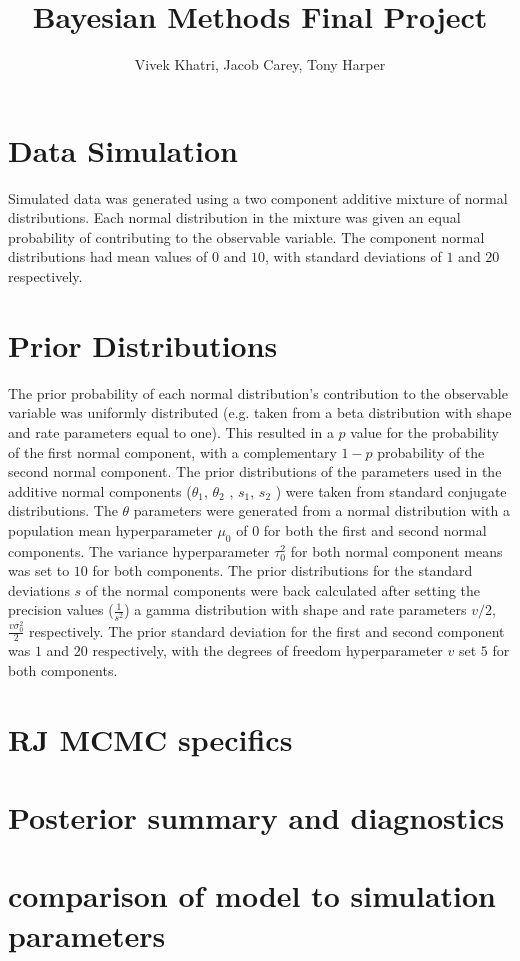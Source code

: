 \documentclass[12pt]{article}
\title{Bayesian Methods Final Project}
\author{Vivek Khatri, Jacob Carey, Tony Harper}
\date{}
\begin{document}
\section*{Data Simulation}
Simulated data was generated using a two component additive mixture of normal distributions.  Each normal distribution in the mixture was given an equal probability of contributing to the observable variable. The component normal distributions had mean values of $0$ and $10$, with standard deviations of $1$ and $20$ respectively.

\section*{Prior Distributions}
The prior probability of each normal distribution’s contribution to the observable variable was uniformly distributed (e.g. taken from a beta distribution with shape and rate parameters equal to one). This resulted in a $p$ value for the probability of the first normal component, with a complementary $1-p$ probability of the second normal component.
The prior distributions of the parameters used in the additive normal components ($\theta_1$, $\theta_2$ , $s_1$, $s_2$ ) were taken from standard conjugate distributions. The $\theta$ parameters were generated from a normal distribution with a population mean hyperparameter $\mu_0$ of $0$ for both the first and second normal components. The variance hyperparameter $\tau_0^2$ for both normal component means was set to $10$ for both components.
	The prior distributions for the standard deviations $s$ of the normal components were back calculated after setting the precision values ($\frac{1}{s^2}$)  a gamma distribution with shape and rate parameters $v/2$, $\frac{v\sigma_0^2}{2}$ respectively. The prior standard deviation for the first and second component  was $1$ and $20$ respectively, with the degrees of freedom hyperparameter $v$ set $5$ for both components. 

\section*{RJ MCMC specifics}

\section*{Posterior summary and diagnostics}

\section*{comparison of model to simulation parameters}
\end{document}
